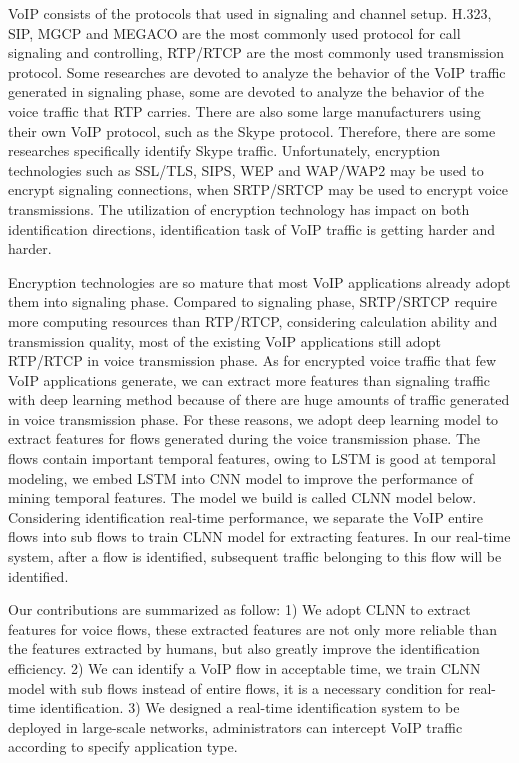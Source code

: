 \documentclass[conference]{IEEEtran}
\begin{document}

VoIP consists of the protocols that used in signaling and channel setup. H.323, SIP, MGCP and MEGACO are the most commonly used protocol for call signaling and controlling, RTP/RTCP are the most commonly used transmission protocol. Some researches \cite{14,16,13} are devoted to analyze the behavior of the VoIP traffic generated in signaling phase, some \cite{4,15} are devoted to analyze the behavior of the voice traffic that RTP carries. There are also some large manufacturers using their own VoIP protocol, such as the Skype protocol. Therefore, there are some researches \cite{skype1,skype2,skype3} specifically identify Skype traffic. Unfortunately, encryption technologies such as SSL/TLS, SIPS, WEP and WAP/WAP2 may be used to encrypt signaling connections, when SRTP/SRTCP may be used to encrypt voice transmissions. The utilization of encryption technology has impact on both identification directions, identification task of VoIP traffic is getting harder and harder.

Encryption technologies are so mature that most VoIP applications already adopt them into signaling phase. Compared to signaling phase, SRTP/SRTCP require more computing resources than RTP/RTCP, considering calculation ability and transmission quality, most of the existing VoIP applications still adopt RTP/RTCP in voice transmission phase. As for encrypted voice traffic that few VoIP applications generate, we can extract more features than signaling traffic with deep learning method because of there are huge amounts of traffic generated in voice transmission phase. For these reasons, we adopt deep learning model to extract features for flows generated during the voice transmission phase. The flows contain important temporal features, owing to LSTM is good at temporal modeling, we embed LSTM into CNN model to improve the performance of mining temporal features. The model we build is called CLNN model below. Considering identification real-time performance, we separate the VoIP entire flows into sub flows to train CLNN model for extracting features. In our real-time system, after a flow is identified, subsequent traffic belonging to this flow will be identified.

Our contributions are summarized as follow: 1) We adopt CLNN to extract features for voice flows, these extracted features are not only more reliable than the features extracted by humans, but also greatly improve the identification efficiency. 2) We can identify a VoIP flow in acceptable time, we train CLNN model with sub flows instead of entire flows, it is a necessary condition for real-time identification. 3) We designed a real-time identification system to be deployed in large-scale networks, administrators can intercept VoIP traffic according to specify application type.
\end{document}
